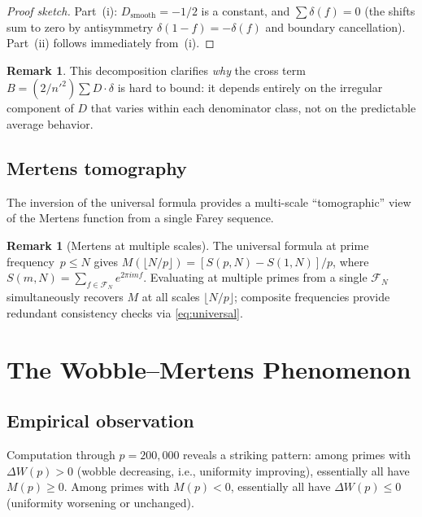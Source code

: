 \documentclass[11pt]{article}
\theoremstyle{definition}
\newtheorem{remark}[theorem]{Remark}
\newcommand{\F}{\mathcal{F}}
\begin{document}
\begin{proof}[Proof sketch]
Part~(i): $D_{\mathrm{smooth}} = -1/2$ is a constant, and
$\sum \delta(f) = 0$ (the shifts sum to zero by antisymmetry
$\delta(1-f) = -\delta(f)$ and boundary cancellation).
Part~(ii) follows immediately from~(i).
\end{proof}

\begin{remark}
This decomposition clarifies \emph{why} the cross term
$B = (2/n'^2)\sum D \cdot \delta$ is hard to bound:
it depends entirely on the irregular component of $D$
that varies within each denominator class, not on the
predictable average behavior.
\end{remark}

\subsection{Mertens tomography}

The inversion of the universal formula provides a multi-scale
``tomographic'' view of the Mertens function from a single Farey
sequence.

\begin{remark}[Mertens at multiple scales]
The universal formula at prime frequency~$p \le N$ gives
$M(\lfloor N/p \rfloor) = [S(p,N) - S(1,N)]/p$,
where $S(m,N) = \sum_{f \in \F_N} e^{2\pi imf}$.
Evaluating at multiple primes from a single $\F_N$ simultaneously
recovers $M$ at all scales $\lfloor N/p \rfloor$; composite
frequencies provide redundant consistency checks via
\eqref{eq:universal}.
\end{remark}


\section{The Wobble--Mertens Phenomenon}\label{sec:phenomenon}

\subsection{Empirical observation}

Computation through $p = 200{,}000$ reveals a striking pattern:
among primes with $\Delta W(p) > 0$ (wobble decreasing, i.e.,
uniformity improving), essentially all have $M(p) \ge 0$.  Among
primes with $M(p) < 0$, essentially all have $\Delta W(p) \le 0$
(uniformity worsening or unchanged).
\end{document}

